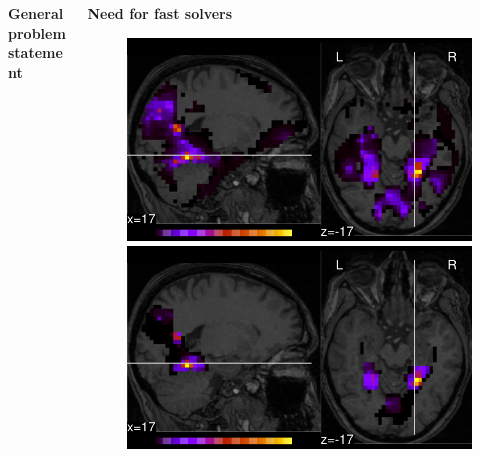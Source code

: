 \documentclass[french]{STIC_poster}
\begin{document}
\begin{frame}[t]
\begin{columns}[t]
\begin{column}{.48\linewidth}
\begin{sxbox}[\textwidth]{\textbf{General problem statement}}
				\end{sxbox}
			\end{column}
			\hfill
			\begin{column}{.48\linewidth}
				\begin{nbox}[\textwidth]{\textbf{Need for fast solvers}}
                                  \begin{figure}
                                    \includegraphics[width=.32\linewidth]{maps/face_vs_house_tol_0_1.pdf}%
                                    \hfill%
                                    \includegraphics[width=.32\linewidth]{maps/face_vs_house_tol_0_001.pdf}%
\end{figure}
\end{nbox}
\end{column}
\end{columns}
\end{frame}
\end{document}
